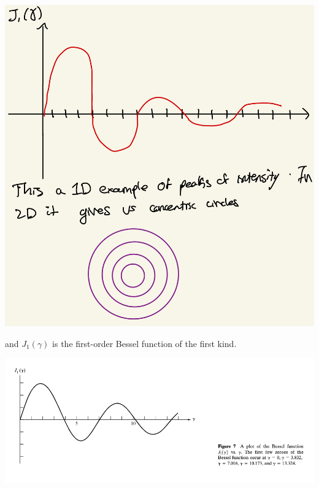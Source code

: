 \documentclass[10pt]{article}
\begin{document}
\begin{center}
    \includegraphics[scale = .2]{imgs/intesity-circ.jpeg}
\end{center}

and $J_1(\gamma)$ is the first-order Bessel function of the first kind.

\begin{center}
    \includegraphics[scale = .8]{imgs/bessel-function.png}
\end{center}
\end{document}
